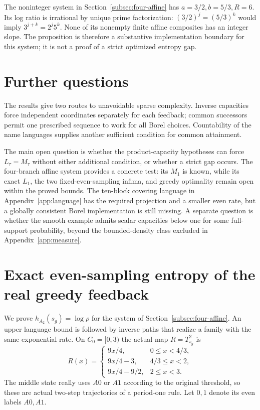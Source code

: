 \documentclass[11pt,reqno]{amsart}
\numberwithin{equation}{section}
\theoremstyle{definition}
\begin{document}
The noninteger system in Section~\ref{subsec:four-affine} has
$a=3/2,b=5/3,R=6$. Its log ratio is irrational by unique prime
factorization: $(3/2)^j=(5/3)^k$ would imply
$3^{j+k}=2^j5^k$. None of its nonempty finite affine composites
has an integer slope. The proposition is therefore a substantive
implementation boundary for this system; it is not a proof of a
strict optimized entropy gap.

\section{Further questions}\label{app:scope}
The results give two routes to unavoidable sparse complexity.
Inverse capacities force independent coordinates separately for each
feedback; common successors permit one prescribed sequence to work
for all Borel choices. Countability of the name languages supplies
another sufficient condition for common attainment.

The main open question is whether the product-capacity hypotheses
can force $L_\tau=M_\tau$ without either additional condition, or
whether a strict gap occurs. The four-branch affine system provides
a concrete test: its $M_1$ is known, while its exact $L_1$, the two
fixed-even-sampling infima, and greedy optimality remain open within
the proved bounds. The ten-block covering language in
Appendix~\ref{app:language} has the required projection and a smaller
even rate, but a globally consistent Borel implementation is still
missing. A separate question is whether the smooth example admits
scalar capacities below one for some full-support probability,
beyond the bounded-density class excluded in
Appendix~\ref{app:measure}.


\appendix

\section{Exact even-sampling entropy of the real greedy feedback}
\label{app:greedy}

We prove $h_{A_2}(s_g)=\log\rho$ for the system of
Section~\ref{subsec:four-affine}. An upper language bound is followed by
inverse paths that realize a family with the same exponential rate.
On $C_0=[0,3)$ the actual map $R=T_{s_g}^2$ is
\begin{equation}\label{eq:greedy-R}
 R(x)=\begin{cases}
 9x/4,&0\le x<4/3,\\
 9x/4-3,&4/3\le x<2,\\
 9x/4-9/2,&2\le x<3.
 \end{cases}
\end{equation}
The middle state really uses $A0$ or $A1$ according to the original
threshold, so these are actual two-step trajectories of a period-one
rule. Let $0,1$ denote its even labels $A0,A1$.
\end{document}

